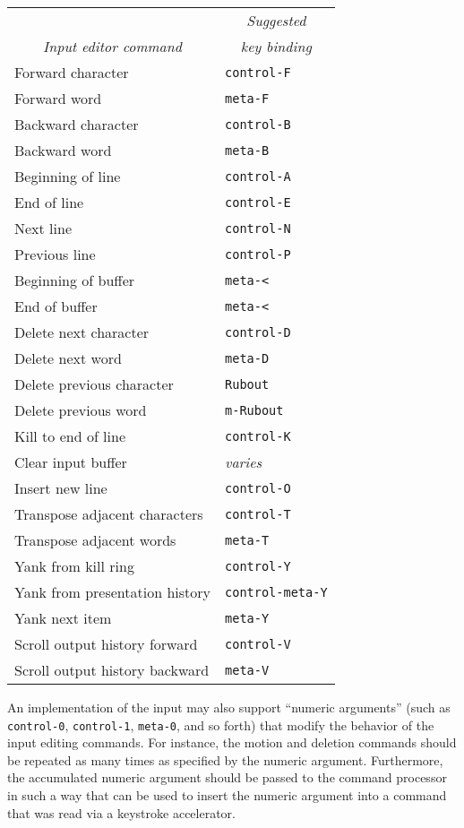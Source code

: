 \begin{tabular}{|l|l|}
\hline
\multicolumn{1}{c}{}                         & \multicolumn{1}{c}{\sl Suggested}   \\ 
\multicolumn{1}{c}{\sl Input editor command} & \multicolumn{1}{c}{\sl key binding} \\
\hline
Forward character   & {\tt control-F} \\
Forward word        & {\tt meta-F}    \\
Backward character  & {\tt control-B} \\
Backward word       & {\tt meta-B}    \\
Beginning of line   & {\tt control-A} \\
End of line         & {\tt control-E} \\
Next line           & {\tt control-N} \\
Previous line       & {\tt control-P} \\
Beginning of buffer & {\tt meta-<}    \\
End of buffer       & {\tt meta-<}    \\
Delete next character     & {\tt control-D} \\
Delete next word          & {\tt meta-D}    \\
Delete previous character & {\tt Rubout}    \\
Delete previous word      & {\tt m-Rubout}  \\
Kill to end of line       & {\tt control-K} \\
Clear input buffer        & {\sl varies}    \\
Insert new line           & {\tt control-O} \\
Transpose adjacent characters  & {\tt control-T}  \\
Transpose adjacent words       & {\tt meta-T}     \\
Yank from kill ring            & {\tt control-Y}  \\
Yank from presentation history & {\tt control-meta-Y} \\
Yank next item                 & {\tt meta-Y}     \\
Scroll output history forward   & {\tt control-V} \\
Scroll output history backward  & {\tt meta-V}    \\
\hline
\end{tabular}

An implementation of the input may also support ``numeric arguments'' (such as
{\tt control-0}, {\tt control-1}, {\tt meta-0}, and so forth) that modify the
behavior of the input editing commands.  For instance, the motion and deletion
commands should be repeated as many times as specified by the numeric argument.
Furthermore, the accumulated numeric argument should be passed to the command
processor in such a way that  can be used
to insert the numeric argument into a command that was read via a keystroke
accelerator.


